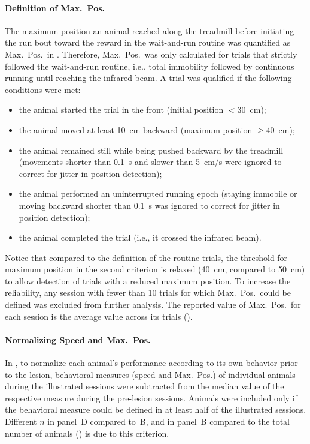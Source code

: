\paragraph{Definition of Max.\ Pos.}
The maximum position an animal reached along the treadmill before initiating the run bout toward the reward in the wait-and-run routine was quantified as Max.\ Pos.\ in .
Therefore, Max.\ Pos.\ was only calculated for trials that strictly followed the wait-and-run routine, i.e., total immobility followed by continuous running until reaching the infrared beam.
A trial was qualified if the following conditions were met:
\begin{itemize}[noitemsep]
    \item the animal started the trial in the front (initial position $< 30$~cm);
    \item the animal moved at least 10~cm backward (maximum position $\geq 40$~cm);
    \item the animal remained still while being pushed backward by the treadmill (movements shorter than 0.1~s and slower than 5~cm/s were ignored to correct for jitter in position detection);
    \item the animal performed an uninterrupted running epoch (staying immobile or moving backward shorter than 0.1~s was ignored to correct for jitter in position detection);
    \item the animal completed the trial (i.e., it crossed the infrared beam).
\end{itemize}
Notice that compared to the definition of the routine trials, the threshold for maximum position in the second criterion is relaxed (40~cm, compared to 50~cm) to allow detection of trials with a reduced maximum position.
To increase the reliability, any session with fewer than 10 trials for which Max.\ Pos.\ could be defined was excluded from further analysis.
The reported value of Max.\ Pos.\ for each session is the average value across its trials ().


\paragraph{Normalizing Speed and Max.\ Pos.}
In , to normalize each animal’s performance according to its own behavior prior to the lesion, behavioral measures (speed and Max.\ Pos.) of individual animals during the illustrated sessions were subtracted from the median value of the respective measure during the pre-lesion sessions.
Animals were included only if the behavioral measure could be defined in at least half of the illustrated sessions.
Different $n$ in panel~D compared to~B, and in panel~B compared to the total number of animals () is due to this criterion.